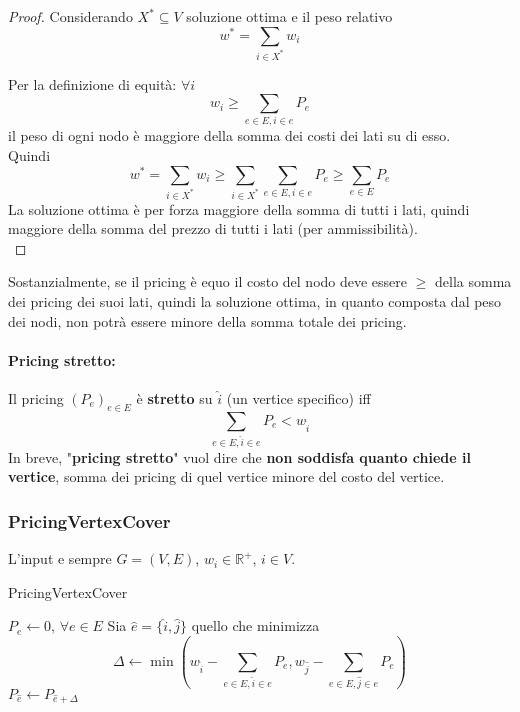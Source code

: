 \begin{proof}
	Considerando $X^\ast \subseteq V$ soluzione ottima e il peso relativo
	$$ w^\ast = \sum_{i \in X^\ast} w_i $$
	
	Per la definizione di equità: $\forall i$ 
	$$ w_i \geq \sum_{e \in E, i \in e} P_e $$
	il peso di ogni nodo è maggiore della somma dei costi dei lati su di esso.\\
	
	Quindi 
	$$ w^\ast = \sum_{i \in X^\ast} w_i \geq \sum_{i \in X^\ast} \sum_{e \in E, i \in e} P_e \geq \sum_{e \in E} P_e $$
	La soluzione ottima è per forza maggiore della somma di tutti i lati, quindi maggiore della somma del prezzo di tutti i lati (per ammissibilità).\\
\end{proof}

Sostanzialmente, se il pricing è equo il costo del nodo deve essere $\geq$ della somma dei pricing dei suoi lati, quindi la soluzione ottima, in quanto composta dal peso dei nodi, non potrà essere minore della somma totale dei pricing.\\

\paragraph{Pricing stretto:} Il pricing $(P_e)_{e \in E}$ è \textbf{stretto} su $\hat{i}$ (un vertice specifico) iff
$$ \sum_{e \in E, \hat{i} \in e} P_e < w_{\hat{i}} $$
In breve, "\textbf{pricing stretto}" vuol dire che \textbf{non soddisfa quanto chiede il vertice}, somma dei pricing di quel vertice minore del costo del vertice.\\

\newpage

\subsubsection{PricingVertexCover}
L'input e sempre $G = (V,E)$, $w_i \in \mathbb{R}^+$, $i \in V$.

\begin{algorithm}
	\caption{PricingVertexCover}
	\begin{algorithmic}
		\STATE $P_e \leftarrow 0$, $\forall e \in E$
		\STATE Sia $\hat{e} = \{\hat{i}, \hat{j}\}$ quello che minimizza 
		$$\Delta \leftarrow \min \left(w_{\hat{i}} - \sum_{e \in E, \hat{i} \in e} P_e, w_{\hat{j}} - \sum_{e \in E, \hat{j} \in e} P_e \right)$$
		\STATE $P_{\hat{e}} \leftarrow P_{\hat{e} + \Delta}$
		\ENDWHILE
	\end{algorithmic}
\end{algorithm}

